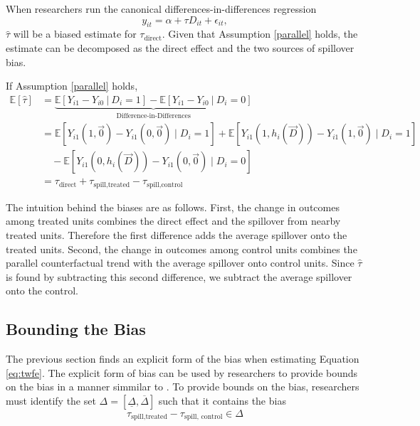 \documentclass[11pt]{article}
\begin{document}
When researchers run the canonical differences-in-differences regression \[ 
    y_{it}  = \alpha + \tau D_{it} + \epsilon_{it},
\]
$\hat{\tau}$ will be a biased estimate for $\tau_{\text{direct}}$.
Given that Assumption \ref{parallel} holds, the estimate can be decomposed as the direct effect and the two sources of spillover bias.

\begin{theorem}
    \label{thm:bias}
    If Assumption \ref{parallel} holds, 
    \begin{align*}
        \mathbb{E}[\hat{\tau}] &= \underbrace{\mathbb{E}\left[ Y_{i1} - Y_{i0} \ \vert \ D_i = 1 \right] - \mathbb{E}\left[ Y_{i1} - Y_{i0} \ \vert \ D_i = 0 \right]}_{\text{Difference-in-Differences}} \\ 
        &= 
        \mathbb{E} \left[ Y_{i1}(1, \vec{0}) - Y_{i1}(0, \vec{0}) \mid D_i = 1 \right] + \mathbb{E} \left[ Y_{i1}(1, h_i(\vec{D})) - Y_{i1}(1, \vec{0}) \mid D_i = 1 \right] \\
        &\quad - \mathbb{E} \left[ Y_{i1}(0, h_i(\vec{D})) - Y_{i1}(0, \vec{0}) \mid D_i = 0 \right] \\
        &= \tau_{\text{direct}} + \tau_{\text{spill,treated}} - \tau_{\text{spill,control}}
    \end{align*}
\end{theorem}

The intuition behind the biases are as follows. First, the change in outcomes among treated units combines the direct effect and the spillover from nearby treated units. Therefore the first difference adds the average spillover onto the treated units. Second, the change in outcomes among control units combines the parallel counterfactual trend with the average spillover onto control units. Since $\hat{\tau}$ is found by subtracting this second difference, we subtract the average spillover onto the control. 



\subsection{Bounding the Bias}

The previous section finds an explicit form of the bias when estimating Equation \ref{eq:twfe}. The explicit form of bias can be used by researchers to provide bounds on the bias in a manner simmilar to \citet{Rambachan_Roth_2020}. To provide bounds on the bias, researchers must identify the set $\Delta = [\underline{\Delta}, \overline{\Delta}]$ such that it contains the bias \[ 
    \tau_{\text{spill,treated}} - \tau_{\text{spill, control}} \in \Delta
\]
\end{document}
